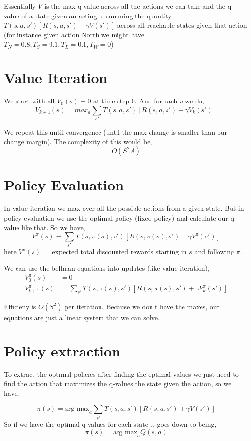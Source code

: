 Essentially $V$ is the max q value across all the actions we can take and the  q-value of a state given an acting is summing the quantity $T(s,a,s')[R(s, a, s') + \gamma V(s')]$ across all reachable states given that action (for instance given action North we might have $T_N=0.8, T_S = 0.1, T_E=0.1, T_W=0$)


\section{Value Iteration}
We start with all $V_0(s) = 0$ at time step $0$. And for each  $s$ we do, 
$$ V_{k + 1} (s) = max_a \sum_{s'} T(s, a, s') [ R(s, a, s') + \gamma V_k(s')] $$ 

We repeat this until convergence (until the max change is smaller than our change margin). The complexity of this would be, 
$$ O(S^2A) $$ 

\section{Policy Evaluation}
In value iteration we max over all the possible actions from a given state. But in policy evaluation we use the optimal policy (fixed policy) and calculate our q-value like that. So we have, 
$$ V^{\pi}(s) = \sum_{s'}T(s, \pi(s), s')[R(s, \pi(s), s') + \gamma V^{\pi} (s')] $$ 
here $V^{\pi}(s) =$ expected total discounted rewards starting in $s$ and following $\pi$.

We can use the bellman equations into updates (like value iteration), 
\begin{align*}
    V_0^{\pi}(s) &= 0\\
    V_{k + 1}^{\pi}(s) &= \sum_{s'}T(s, \pi(s), s') [R(s, \pi(s), s') + \gamma V_k^{\pi}(s')]
\end{align*}

Efficieny is $O(S^2)$ per iteration. Because we don't have the maxes, our equations are just a linear system that we can solve.


\section{Policy extraction}
To extract the optimal policies after finding the optimal values we just need to find the action that maximizes the q-values the state given the action, so we have, 

$$ \pi(s) = \text{arg max}_a \sum_{s'} T(s, a, s') [ R(s, a, s') + \gamma V(s')] $$ 
So if we have the optimal q-values for each state it goes down to being,  
$$ \pi(s) = \text{arg max}_a Q(s, a)$$


